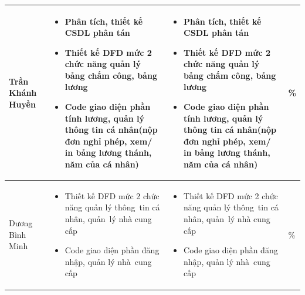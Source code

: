 \documentclass[a4paper,12pt]{report}
\begin{document}
\begin{center}
\begin{longtable}{|>{\centering\arraybackslash}p{3cm}|
        >{\centering\arraybackslash}p{5.5cm}|
        >{\centering\arraybackslash}p{5.5cm}|
        >{\centering\arraybackslash}p{1.5cm}|}
        \hline
        Trần Khánh Huyền                                                                                                              &
        \begin{itemize}
            \item Phân tích, thiết kế CSDL phân tán
            \item Thiết kế DFD mức 2 chức năng quản lý bảng chấm công, bảng lương
            \item Code giao diện phần tính lương, quản lý thông tin cá nhân(nộp đơn nghỉ phép, xem/ in bảng lương thánh, năm của cá nhân)
        \end{itemize} &
        \begin{itemize}
            \item Phân tích, thiết kế CSDL phân tán
            \item Thiết kế DFD mức 2 chức năng quản lý bảng chấm công, bảng lương
            \item Code giao diện phần tính lương, quản lý thông tin cá nhân(nộp đơn nghỉ phép, xem/ in bảng lương thánh, năm của cá nhân)
        \end{itemize}
                                                                                                                                      & 100\% \\
        \hline
        Dương Bình Minh                                                                                                               &
        \begin{itemize}
            \item Thiết kế DFD mức 2 chức năng quản lý thông~tin cá nhân, quản~lý nhà cung cấp
            \item Code giao diện phần đăng nhập, quản lý nhà~cung cấp
        \end{itemize}
                                                                                                                                      &
        \begin{itemize}
            \item Thiết kế DFD mức 2 chức năng quản lý thông~tin cá nhân, quản~lý nhà cung cấp
            \item Code giao diện phần đăng nhập, quản lý nhà~cung cấp
        \end{itemize}
                                                                                                                                      & 100\% \\
        \hline

\end{longtable}
\end{center}
\end{document}
